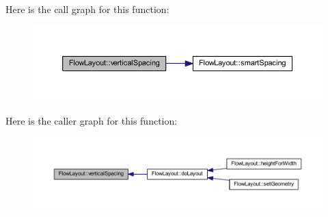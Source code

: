 Here is the call graph for this function\+:
\nopagebreak
\begin{figure}[H]
\begin{center}
\leavevmode
\includegraphics[width=350pt]{class_flow_layout_a1b15dce81c6bce51290d3b55c35dcd3e_cgraph}
\end{center}
\end{figure}




Here is the caller graph for this function\+:
\nopagebreak
\begin{figure}[H]
\begin{center}
\leavevmode
\includegraphics[width=350pt]{class_flow_layout_a1b15dce81c6bce51290d3b55c35dcd3e_icgraph}
\end{center}
\end{figure}




